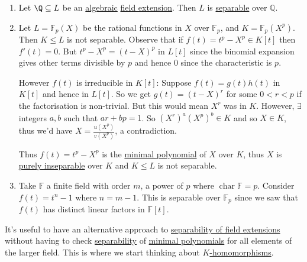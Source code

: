 \documentclass{article}
\DeclareMathOperator{\chara}{char}
\newcommand{\F}{\mathbb{F}}
\begin{document}
\begin{eg}
    \leavevmode
    \begin{enumerate}[label=(\arabic*)]
        \item Let $\Q \subseteq L$ be an \hyperlink{def:algebraic}{algebraic} \hyperlink{def:fieldExt}{field extension}. Then $L$ is \hyperlink{def:separablePoly}{separable} over $\mathbb{Q}$.
        \item Let $L = \F_p(X)$ be the rational functions in $X$ over $\F_p$, and $K = \F_p(X^p)$.
            Then $K \leq L$ is not separable.
            Observe that if $f(t) = t^p - X^p \in K[t]$ then $f'(t) = 0$.
            But $t^p - X^p = (t-X)^p$ in $L[t]$ since the binomial expansion gives other terms divisible by $p$ and hence $0$ since the characteristic is $p$.

            However $f(t)$ is irreducible in $K[t]$:
            Suppose $f(t) = g(t) h(t)$ in $K[t]$ and hence in $L[t]$. So we get $g(t) = (t-X)^r$ for some $0 < r < p$ if the factorisation is non-trivial.
            But this would mean $X^r$ was in $K$. However, $\exists$integers $a, b$ such that $ar + bp = 1$.
            So $(X^r)^a (X^p)^b \in K$ and so $X \in K$, thus we'd have $X = \frac{u(X^p)}{v(X^p)}$, a contradiction.

            Thus $f(t) = t^p - X^p$ is the \hyperlink{def:minimalPoly}{minimal polynomial} of $X$ over $K$, thus $X$ is \hyperlink{def:separableExt}{purely inseparable} over $K$ and $K \leq L$ is not separable.
        \item Take $\F$ a finite field with order $m$, a power of $p$ where $\chara \F = p$. Consider $f(t) = t^n - 1$ where $n = m-1$. This is separable over $\F_p$ since we saw that $f(t)$ has distinct linear factors in $\F[t]$.
    \end{enumerate}
\end{eg}

\begin{remark}
    It's useful to have an alternative approach to \hyperlink{def:separableExt}{separability of field extensions} without having to check \hyperlink{def:separablePoly}{separability}
    of \hyperlink{def:minimalPoly}{minimal polynomials} for all elements of the larger field.
    This is where we start thinking about \hyperlink{def:homo}{$K$-homomorphisms}.
\end{remark}
\end{document}
